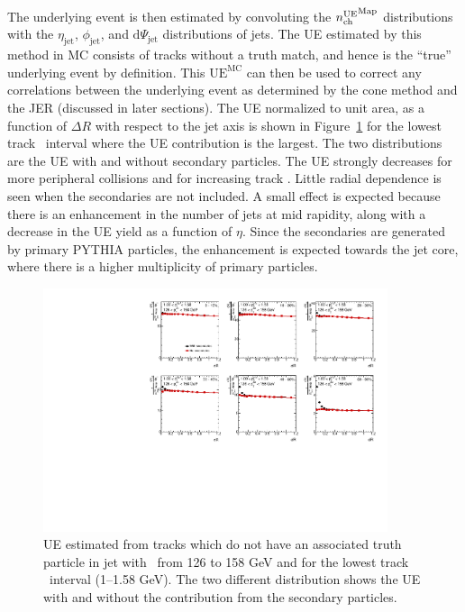 The underlying event is then estimated by convoluting the $\mbox{$n_{\mathrm{ch}}^{\mathrm{UE}}$}^{\mathrm{Map}}$ distributions with the $\eta_{\mathrm{jet}}$, $\phi_{\mathrm{jet}}$, and $\mathrm{d}\Psi_{\mathrm{jet}}$ distributions of jets.
The UE estimated by this method in MC consists of tracks without a truth match, and hence is the ``true'' underlying event by definition.
This $\mathrm{UE}^{\mathrm{MC}}$ can then be used to correct any correlations between the underlying event as determined by the cone method and the JER (discussed in later sections).
The UE normalized to unit area, as a function of $\Delta R$ with respect to the jet axis is shown in Figure~\ref{fig:UEdR} for the lowest track \pt\ interval where the UE contribution is the largest.
The two distributions are the UE with and without secondary particles.
The UE strongly decreases for more peripheral collisions and for increasing track \pt.
Little radial dependence is seen when the secondaries are not included.
A small effect is expected because there is an enhancement in the number of jets at mid rapidity, along with a decrease in the UE yield as a function of $\eta$.
Since the secondaries are generated by primary PYTHIA particles, the enhancement is expected towards the jet core, where there is a higher multiplicity of primary particles.


\begin{figure}
\includegraphics[width=0.9\textwidth]{figures/main/UE/UE_v_dR_pt1GeV.pdf}
\caption{UE estimated from tracks which do not have an associated truth particle in jet with \pt\ from 126 to 158 GeV and for the lowest track \pt\ interval (1--1.58 GeV).
The two different distribution shows the UE with and without the contribution from the secondary particles.}
\label{fig:UEdR}
\end{figure}   

